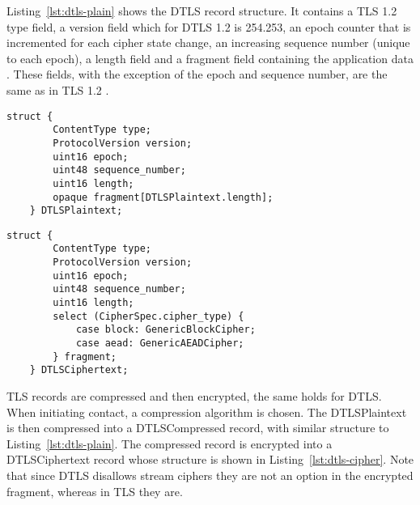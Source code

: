 \documentclass[0-thesis.tex]{subfiles}
\begin{document}
Listing~\ref{lst:dtls-plain} shows the DTLS record structure. It contains a TLS 1.2 type
field, a version field which for DTLS 1.2 is 254.253, an epoch counter that is incremented
for each cipher state change, an increasing sequence number (unique to each epoch), a
length field and a fragment field containing the application data \parencite{rfc5246}.
These fields, with the exception of the epoch and sequence number, are the same 
as in TLS 1.2 \parencite{rfc6347}.

\begin{lstlisting}[language=blockc,
                    caption={The DTLS plaintext record structure.}, 
                    label={lst:dtls-plain}]
    struct {
        ContentType type;
        ProtocolVersion version;
        uint16 epoch;
        uint48 sequence_number;
        uint16 length;
        opaque fragment[DTLSPlaintext.length];
    } DTLSPlaintext;
\end{lstlisting}

\begin{lstlisting}[language=blockc,
                    caption={The DTLS ciphertext record structure.}, 
                    label={lst:dtls-cipher}]
    struct {
        ContentType type;
        ProtocolVersion version;
        uint16 epoch;
        uint48 sequence_number;
        uint16 length;
        select (CipherSpec.cipher_type) {
            case block: GenericBlockCipher;
            case aead: GenericAEADCipher;
        } fragment;
    } DTLSCiphertext;
\end{lstlisting}

TLS records are compressed and then encrypted, the same holds for DTLS. When initiating
contact, a compression algorithm is chosen. The DTLSPlaintext is then compressed into a
DTLSCompressed record, with similar structure to Listing~\ref{lst:dtls-plain}. The
compressed record is encrypted into a DTLSCiphertext record whose structure is shown in
Listing~\ref{lst:dtls-cipher}. Note that since DTLS disallows stream ciphers they are not
an option in the encrypted fragment, whereas in TLS they are.
\end{document}
